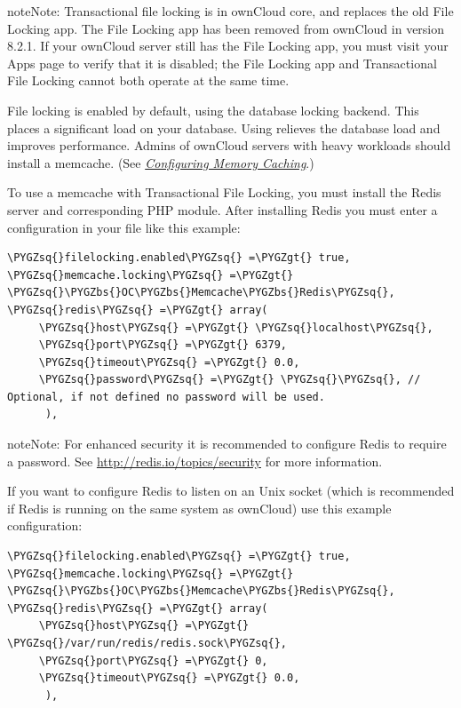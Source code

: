 \documentclass[letterpaper,10pt,english]{sphinxmanual}
\def\PYGZbs{\char`\\}
\def\PYGZgt{\char`\>}
\def\PYGZsq{\char`\'}
\renewcommand\PYGZsq{\textquotesingle}
\begin{document}
\begin{notice}{note}{Note:}
Transactional file locking is in ownCloud core, and replaces the old
File Locking app. The File Locking app has been removed from ownCloud in
version 8.2.1. If your ownCloud server still has the File Locking app, you
must visit your Apps page to verify that it is disabled; the File Locking
app and Transactional File Locking cannot both operate at the same time.
\end{notice}

File locking is enabled by default, using the database locking backend. This
places a significant load on your database. Using  relieves
the database load and improves performance. Admins of ownCloud servers with
heavy workloads should install a memcache. (See
{\hyperref[configuration_server/caching_configuration::doc]{\emph{\emph{Configuring Memory Caching}}}}.)

To use a memcache with Transactional File Locking, you must install the Redis
server and corresponding PHP module. After installing Redis you must enter a
configuration in your  file like this example:

\begin{Verbatim}[commandchars=\\\{\}]
\PYGZsq{}filelocking.enabled\PYGZsq{} =\PYGZgt{} true,
\PYGZsq{}memcache.locking\PYGZsq{} =\PYGZgt{} \PYGZsq{}\PYGZbs{}OC\PYGZbs{}Memcache\PYGZbs{}Redis\PYGZsq{},
\PYGZsq{}redis\PYGZsq{} =\PYGZgt{} array(
     \PYGZsq{}host\PYGZsq{} =\PYGZgt{} \PYGZsq{}localhost\PYGZsq{},
     \PYGZsq{}port\PYGZsq{} =\PYGZgt{} 6379,
     \PYGZsq{}timeout\PYGZsq{} =\PYGZgt{} 0.0,
     \PYGZsq{}password\PYGZsq{} =\PYGZgt{} \PYGZsq{}\PYGZsq{}, // Optional, if not defined no password will be used.
      ),
\end{Verbatim}

\begin{notice}{note}{Note:}
For enhanced security it is recommended to configure Redis to require
a password. See \href{http://redis.io/topics/security}{http://redis.io/topics/security} for more information.
\end{notice}

If you want to configure Redis to listen on an Unix socket (which is
recommended if Redis is running on the same system as ownCloud) use this example
 configuration:

\begin{Verbatim}[commandchars=\\\{\}]
\PYGZsq{}filelocking.enabled\PYGZsq{} =\PYGZgt{} true,
\PYGZsq{}memcache.locking\PYGZsq{} =\PYGZgt{} \PYGZsq{}\PYGZbs{}OC\PYGZbs{}Memcache\PYGZbs{}Redis\PYGZsq{},
\PYGZsq{}redis\PYGZsq{} =\PYGZgt{} array(
     \PYGZsq{}host\PYGZsq{} =\PYGZgt{} \PYGZsq{}/var/run/redis/redis.sock\PYGZsq{},
     \PYGZsq{}port\PYGZsq{} =\PYGZgt{} 0,
     \PYGZsq{}timeout\PYGZsq{} =\PYGZgt{} 0.0,
      ),
\end{Verbatim}
\end{document}
